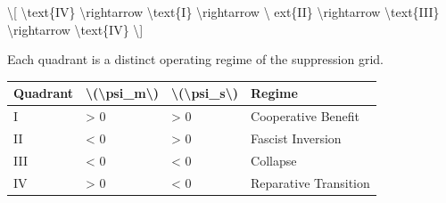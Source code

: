 \textbackslash{[} \textbackslash text\{IV\} \textbackslash rightarrow
\textbackslash text\{I\} \textbackslash rightarrow \textbackslash
ext\{II\} \textbackslash rightarrow \textbackslash text\{III\}
\textbackslash rightarrow \textbackslash text\{IV\} \textbackslash{]}

Each quadrant is a distinct operating regime of the suppression grid.

{\def\LTcaptype{none} %
\begin{longtable}[]{@{}llll@{}}
\toprule\noalign{}
Quadrant & \textbackslash(\textbackslash psi\_m\textbackslash) &
\textbackslash(\textbackslash psi\_s\textbackslash) & Regime \\
\midrule\noalign{}
\endhead
\bottomrule\noalign{}
\endlastfoot
I & \textgreater{} 0 & \textgreater{} 0 & Cooperative Benefit \\
II & \textless{} 0 & \textgreater{} 0 & Fascist Inversion \\
III & \textless{} 0 & \textless{} 0 & Collapse \\
IV & \textgreater{} 0 & \textless{} 0 & Reparative Transition \\
\end{longtable}
}

